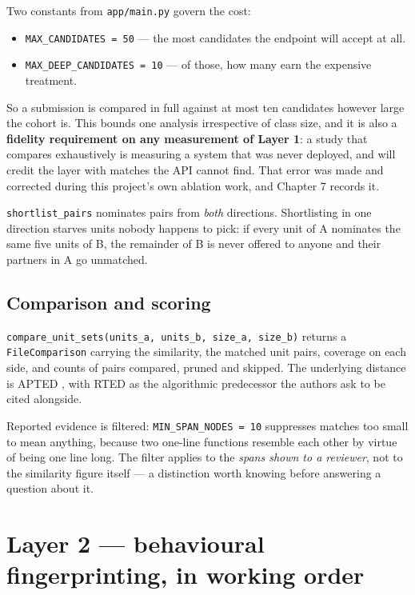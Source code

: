 Two constants from \texttt{app/main.py} govern the cost:

\begin{itemize}
\tightlist
\item
  \texttt{MAX\_CANDIDATES\ =\ 50} --- the most candidates the endpoint
  will accept at all.
\item
  \texttt{MAX\_DEEP\_CANDIDATES\ =\ 10} --- of those, how many earn the
  expensive treatment.
\end{itemize}

So a submission is compared in full against at most ten candidates
however large the cohort is. This bounds one analysis irrespective of
class size, and it is also a \textbf{fidelity requirement on any
measurement of Layer 1}: a study that compares exhaustively is measuring
a system that was never deployed, and will credit the layer with matches
the API cannot find. That error was made and corrected during this
project's own ablation work, and Chapter 7 records it.

\texttt{shortlist\_pairs} nominates pairs from \emph{both} directions.
Shortlisting in one direction starves units nobody happens to pick: if
every unit of A nominates the same five units of B, the remainder of B
is never offered to anyone and their partners in A go unmatched.

\hypertarget{comparison-and-scoring}{%
\subsection{Comparison and scoring}\label{comparison-and-scoring}}

\texttt{compare\_unit\_sets(units\_a,\ units\_b,\ size\_a,\ size\_b)}
returns a \texttt{FileComparison} carrying the similarity, the matched
unit pairs, coverage on each side, and counts of pairs compared, pruned
and skipped. The underlying distance is APTED \cite{pawlik2016}, with
RTED \cite{pawlik2015} as the algorithmic predecessor the authors ask to
be cited alongside.

Reported evidence is filtered: \texttt{MIN\_SPAN\_NODES\ =\ 10}
suppresses matches too small to mean anything, because two one-line
functions resemble each other by virtue of being one line long. The
filter applies to the \emph{spans shown to a reviewer}, not to the
similarity figure itself --- a distinction worth knowing before
answering a question about it.

\hypertarget{layer-2-behavioural-fingerprinting-in-working-order}{%
\section{Layer 2 --- behavioural fingerprinting, in working
order}\label{layer-2-behavioural-fingerprinting-in-working-order}}

